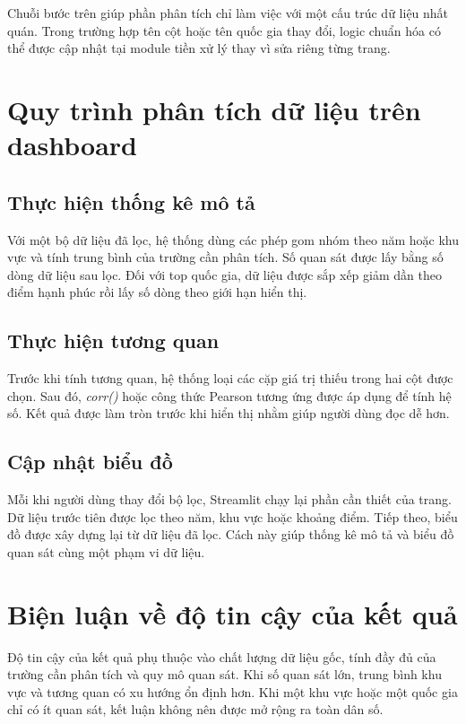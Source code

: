 Chuỗi bước trên giúp phần phân tích chỉ làm việc với một cấu trúc dữ liệu nhất quán. Trong trường hợp tên cột hoặc tên quốc gia thay đổi, logic chuẩn hóa có thể được cập nhật tại module tiền xử lý thay vì sửa riêng từng trang.

\section{Quy trình phân tích dữ liệu trên dashboard}

\subsection{Thực hiện thống kê mô tả}

Với một bộ dữ liệu đã lọc, hệ thống dùng các phép gom nhóm theo năm hoặc khu vực và tính trung bình của trường cần phân tích. Số quan sát được lấy bằng số dòng dữ liệu sau lọc. Đối với top quốc gia, dữ liệu được sắp xếp giảm dần theo điểm hạnh phúc rồi lấy số dòng theo giới hạn hiển thị.

\subsection{Thực hiện tương quan}

Trước khi tính tương quan, hệ thống loại các cặp giá trị thiếu trong hai cột được chọn. Sau đó, \textit{corr()} hoặc công thức Pearson tương ứng được áp dụng để tính hệ số. Kết quả được làm tròn trước khi hiển thị nhằm giúp người dùng đọc dễ hơn.

\subsection{Cập nhật biểu đồ}

Mỗi khi người dùng thay đổi bộ lọc, Streamlit chạy lại phần cần thiết của trang. Dữ liệu trước tiên được lọc theo năm, khu vực hoặc khoảng điểm. Tiếp theo, biểu đồ được xây dựng lại từ dữ liệu đã lọc. Cách này giúp thống kê mô tả và biểu đồ quan sát cùng một phạm vi dữ liệu.

\section{Biện luận về độ tin cậy của kết quả}

Độ tin cậy của kết quả phụ thuộc vào chất lượng dữ liệu gốc, tính đầy đủ của trường cần phân tích và quy mô quan sát. Khi số quan sát lớn, trung bình khu vực và tương quan có xu hướng ổn định hơn. Khi một khu vực hoặc một quốc gia chỉ có ít quan sát, kết luận không nên được mở rộng ra toàn dân số.

